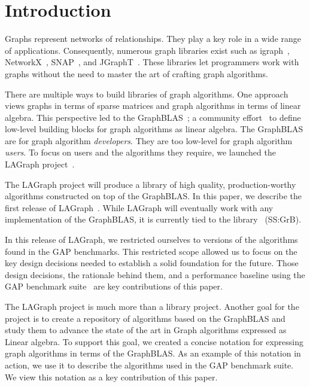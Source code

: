 \section{Introduction}
\label{sec:introduction}

Graphs represent networks of relationships. They play a key role in 
a wide range of applications.   Consequently, numerous graph libraries exist 
such as igraph~\cite{igraph}, NetworkX~\cite{DBLP:reference/snam/X18xv}, SNAP~\cite{DBLP:journals/tist/LeskovecS16}, and JGraphT~\cite{DBLP:journals/toms/MichailKNS20}.
These libraries let programmers work with graphs without the need to master the art of crafting graph algorithms.

There are multiple ways to build libraries of graph algorithms.  One approach
views graphs in terms of sparse matrices and graph algorithms in terms of 
linear algebra. This perspective led to the 
GraphBLAS~\cite{DBLP:conf/hpec/MattsonBBBDFFGGHKLLPPRSWY13,DBLP:conf/hpec/MattsonYMBM17}; 
a community effort~\cite{GraphBLASforum} to define low-level building blocks for graph algorithms as linear algebra.
The GraphBLAS are for graph algorithm \emph{developers}.  They are too 
low-level for graph algorithm \emph{users}.  To focus on users and the 
algorithms they require, we launched the
LAGraph project~\cite{DBLP:conf/ipps/MattsonDKBMMY19}.  

The LAGraph project will produce a library 
of high quality, production-worthy algorithms constructed on top of
the GraphBLAS.  In this paper, we describe the first release of LAGraph~\cite{LAGraphRepo}.
While LAGraph will eventually work with any implementation of the GraphBLAS, it is currently tied to
the \ssgrb library~\cite{SuiteSparseGraphBLAS} (SS:GrB).

In this release of LAGraph, we restricted ourselves to versions of the algorithms found in the GAP benchmarks.
This restricted scope allowed us to focus on the key design decisions needed to establish a solid
foundation for the future.  Those design decisions, the rationale behind them, and a performance baseline 
using the GAP benchmark suite~\cite{DBLP:journals/corr/BeamerAP15} are key contributions of this paper.   

The LAGraph project is much more than a library project.   Another goal for the project is to 
create a repository of algorithms based on the GraphBLAS and study them to advance the state of the art in 
Graph algorithms expressed as Linear algebra. To support this goal, we created a concise notation for expressing
graph algorithms in terms of the GraphBLAS.   As an example of this notation in action, we use it to describe 
the algorithms used in the GAP benchmark suite.  We view this notation as a key contribution of this paper.  

